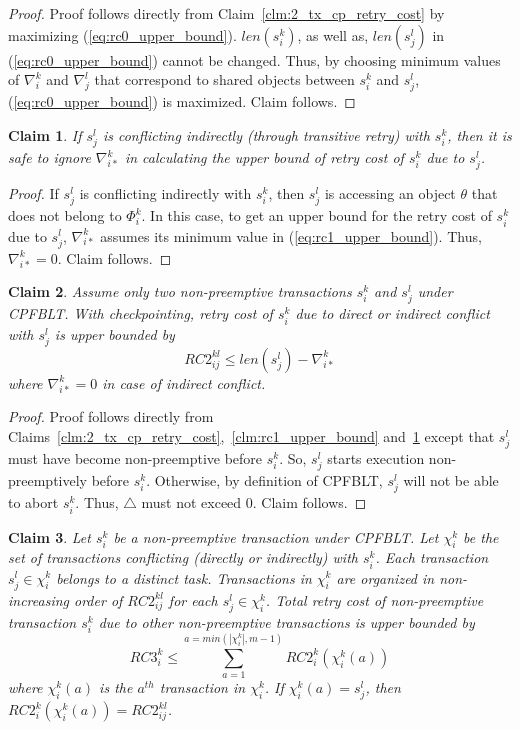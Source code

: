 \documentclass[conference]{IEEEtran}
\newtheorem{clm}{Claim}
\begin{document}
%
\begin{proof}
%
Proof follows directly from Claim~\ref{clm:2_tx_cp_retry_cost} by maximizing (\ref{eq:rc0_upper_bound}). $len\left(s_i^k\right)$, as well as, $len\left(s_j^l\right)$ in (\ref{eq:rc0_upper_bound}) cannot be changed. Thus, by choosing minimum values of $\nabla_i^k$ and $\nabla_j^l$ that correspond to shared objects between $s_i^k$ and $s_j^l$, (\ref{eq:rc0_upper_bound}) is maximized. Claim follows.
%
\end{proof}
%
\begin{clm}\label{clm:cp_with_transitive_retry}
If $s_j^l$ is conflicting indirectly (through transitive retry) with $s_i^k$, then it is safe to ignore $\nabla_{i*}^k$ in calculating the upper bound of retry cost of $s_i^k$ due to $s_j^l$.
\end{clm}
%
\begin{proof}
If $s_j^l$ is conflicting indirectly with $s_i^k$, then $s_j^l$ is accessing an object $\theta$ that does not belong to $\Phi_i^k$. In this case, to get an upper bound for the retry cost of $s_i^k$ due to $s_j^l$, $\nabla_{i*}^k$ assumes its minimum value in (\ref{eq:rc1_upper_bound}). Thus, $\nabla_{i*}^k=0$. Claim follows.
\end{proof}
%
\begin{clm}\label{clm:non_preemptive_2tx_cpfblt_rc}
Assume only two non-preemptive transactions $s_i^k$ and $s_j^l$ under CPFBLT. With checkpointing, retry cost of $s_i^k$ due to direct or indirect conflict with $s_j^l$ is upper bounded by 
%
\begin{equation}
RC2_{ij}^{kl} \le len\left(s_{j}^{l}\right)-\nabla_{i*}^{k}\label{eq:rc2_upper_bound}
\end{equation}
%
where $\nabla_{i*}^k=0$ in case of indirect conflict.
%
\end{clm}
%
\begin{proof}
Proof follows directly from Claims~\ref{clm:2_tx_cp_retry_cost},~\ref{clm:rc1_upper_bound} and~\ref{clm:cp_with_transitive_retry} except that $s_j^l$ must have become non-preemptive before $s_i^k$. So, $s_j^l$ starts execution non-preemptively before $s_i^k$. Otherwise, by definition of CPFBLT, $s_j^l$ will not be able to abort $s_i^k$. Thus, $\triangle$ must not exceed 0. Claim follows.
\end{proof}
%
\begin{clm}\label{clm:non_preemptive_all_tx_rc}
Let $s_i^k$ be a non-preemptive transaction under CPFBLT. Let $\chi_i^k$ be the set of transactions conflicting (directly or indirectly) with $s_i^k$. Each transaction $s_j^l \in \chi_i^k$ belongs to a distinct task. Transactions in $\chi_i^k$ are organized in non-increasing order of $RC2_{ij}^{kl}$ for each $s_j^l \in \chi_i^k$. Total retry cost of non-preemptive transaction $s_i^k$ due to other non-preemptive transactions is upper bounded by 
%
\begin{equation}
RC3_i^k \le \sum_{a=1}^{a=min\left(|\chi_i^k|, m-1\right)} RC2_i^k\left(\chi_i^k(a)\right)
\label{eq:non_preemptive_all_tx_rc}
\end{equation}
%
where $\chi_i^k(a)$ is the $a^{th}$ transaction in $\chi_i^k$. If $\chi_i^k(a)=s_j^l$, then $RC2_i^k\left(\chi_i^k(a)\right)=RC2_{ij}^{kl}$.
%
\end{clm}
\end{document}
